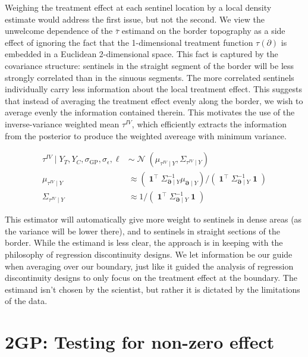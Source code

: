 \documentclass[letter]{article}
\newcommand{\genericdel}[3]{%
      \left#1#3\right#2
    }
\newcommand{\del}[1]{\genericdel(){#1}}
\DeclareMathOperator{\normal}{\mathcal{N}}
\DeclareMathOperator{\ones}{\mathbf{1}}
\newcommand{\trans}{^{\intercal}}
\newcommand{\sigmaf}{\sigma_{\mathrm{GP}}}
\newcommand{\sigman}{\sigma_{\epsilon}}
\newcommand{\boundary}{\partial}
\newcommand{\sentinels}{\bm{\boundary}}
\newcommand{\linavg}{\bar{\tau}}
\newcommand{\invvar}{\tau^{IV}}
\begin{document}
Weighing the treatment effect at each sentinel location by a local
density estimate would address the first issue, but not the second. We
view the unwelcome dependence of the \(\linavg\) estimand on the border
topography as a side effect of ignoring the fact that the 1-dimensional
treatment function \(\tau(\boundary)\) is embedded in a Euclidean
2-dimensional space. This fact is captured by the covariance structure:
sentinels in the straight segment of the border will be less strongly
correlated than in the sinuous segments. The more correlated sentinels
individually carry less information about the local treatment effect.
This suggests that instead of averaging the treatment effect evenly
along the border, we wish to average evenly the information contained
therein. This motivates the use of the inverse-variance weighted mean
\(\invvar\), which efficiently extracts the information from the
posterior to produce the weighted avereage with minimum variance.

\begin{equation}\begin{split}
    \invvar \mid Y_T, Y_C, \sigmaf, \sigman, \ell &\sim \normal\del{\mu_{\invvar \mid Y}, \Sigma_{\invvar \mid Y}} \\
    \mu_{\invvar \mid Y} &\approx \del{\ones\trans \Sigma_{\sentinels \mid Y}^{-1} \mu_{\sentinels \mid Y}} \big/ \del{\ones\trans \Sigma_{\sentinels \mid Y}^{-1} \ones}  \\
    \Sigma_{\invvar \mid Y} &\approx 1 \big/ \del{\ones\trans \Sigma_{\sentinels \mid Y}^{-1} \ones}
\end{split}\label{eq:invvar}\end{equation}

This estimator will automatically give more weight to sentinels in dense
areas (as the variance will be lower there), and to sentinels in
straight sections of the border. While the estimand is less clear, the
approach is in keeping with the philosophy of regression discontinuity
designs. We let information be our guide when averaging over our
boundary, just like it guided the analysis of regression discontinuity
designs to only focus on the treatment effect at the boundary. The
estimand isn't chosen by the scientist, but rather it is dictated by the
limitations of the data.
    


    	\section{2GP: Testing for non-zero
effect}\label{gp-testing-for-non-zero-effect}
\end{document}
